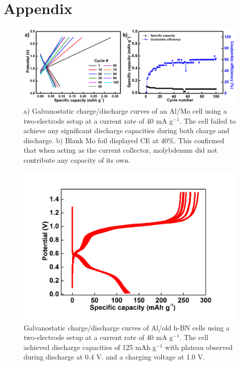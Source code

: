 \chapter{Appendix} %
\label{appA} %
\begin{figure}[tbh!]
\centering
\includegraphics[width=\textwidth]{Figures/appendix/blankmo}
\caption{a) Galvanostatic charge/discharge curves of an Al/Mo cell using a two-electrode setup at a current rate of 40 mA g$^{-1}$. The cell failed to achieve any significant discharge capacities during both charge and discharge. b) Blank Mo foil displayed CE at 40\%. This confirmed that when acting as the current collector, molybdenum did not contribute any capacity of its own.}
\label{Figures/appendix:blankmol}
\end{figure}
\begin{figure}[tbh!]
\centering
\includegraphics[width=\textwidth]{Figures/appendix/hBNrepeat}
\caption{Galvanostatic charge/discharge curves of Al/old h-BN cells using a two-electrode setup at a current rate of 40 mA g$^{-1}$. The cell achieved discharge capacities of 125 mAh g$^{-1}$ with plateau observed during discharge at 0.4 V. and a charging voltage at 1.0 V.}
\label{Figures/appendix:hBNrepeat}
\end{figure}
